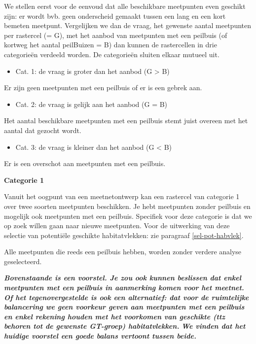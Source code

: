 \documentclass[11pt,]{book}
\providecommand{\tightlist}{%
  \setlength{\itemsep}{0pt}\setlength{\parskip}{0pt}}
\begin{document}
We stellen eerst voor de eenvoud dat alle beschikbare meetpunten even
geschikt zijn: er wordt bvb. geen onderscheid gemaakt tussen een lang en
een kort bemeten meetpunt. Vergelijken we dan de vraag, het gewenste
aantal meetpunten per rastercel (= G), met het aanbod van meetpunten met
een peilbuis (of kortweg het aantal peilBuizen = B) dan kunnen de
rastercellen in drie categorieën verdeeld worden. De categorieën sluiten
elkaar mutueel uit.

\begin{itemize}
\tightlist
\item
  Cat. 1: de vraag is groter dan het aanbod (G \textgreater{} B)
\end{itemize}

Er zijn geen meetpunten met een peilbuis of er is een gebrek aan.

\begin{itemize}
\tightlist
\item
  Cat. 2: de vraag is gelijk aan het aanbod (G = B)
\end{itemize}

Het aantal beschikbare meetpunten met een peilbuis stemt juist overeen
met het aantal dat gezocht wordt.

\begin{itemize}
\tightlist
\item
  Cat. 3: de vraag is kleiner dan het aanbod (G \textless{} B)
\end{itemize}

Er is een overschot aan meetpunten met een peilbuis.

\textbf{Categorie 1}

Vanuit het oogpunt van een meetnetontwerp kan een rastercel van
categorie 1 over twee soorten meetpunten beschikken. Je hebt meetpunten
zonder peilbuis en mogelijk ook meetpunten met een peilbuis. Specifiek
voor deze categorie is dat we op zoek willen gaan naar nieuwe
meetpunten. Voor de uitwerking van deze selectie van potentiële
geschikte habitatvlekken: zie paragraaf \ref{sel-pot-habvlek}.

Alle meetpunten die reeds een peilbuis hebben, worden zonder verdere
analyse geselecteerd.

\emph{\textbf{Bovenstaande is een voorstel. Je zou ook kunnen beslissen
dat enkel meetpunten met een peilbuis in aanmerking komen voor het
meetnet.}} \emph{\textbf{Of het tegenovergestelde is ook een
alternatief: dat voor de ruimtelijke balancering we geen voorkeur geven
aan meetpunten met een peilbuis en enkel rekening houden met het
voorkomen van geschikte (ttz behoren tot de gewenste GT-groep)
habitatvlekken.}} \emph{\textbf{We vinden dat het huidige voorstel een
goede balans vertoont tussen beide.}}
\end{document}
